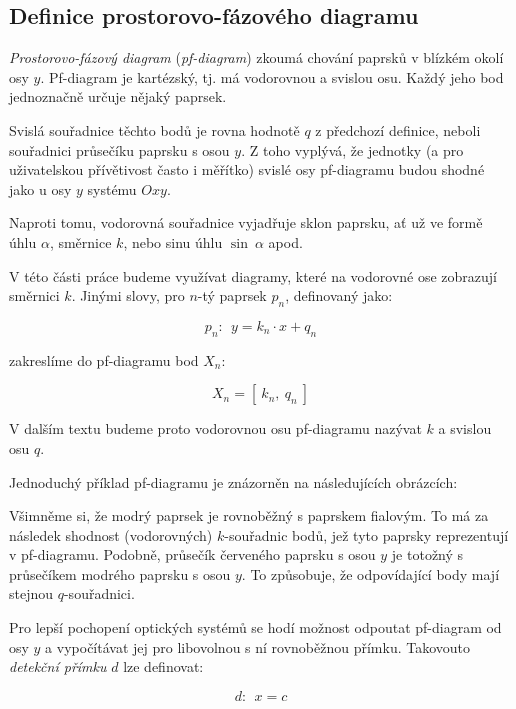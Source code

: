 \subsection{Definice prostorovo-fázového diagramu}

\emph{Prostorovo-fázový diagram} (\emph{pf-diagram}) \parencite{mushaveck2022designing} zkoumá chování paprsků v blízkém okolí osy $y$. Pf-diagram je kartézský, tj. má vodorovnou a svislou osu. Každý jeho bod jednoznačně určuje nějaký paprsek.

Svislá souřadnice těchto bodů je rovna hodnotě $q$ z předchozí definice, neboli souřadnici průsečíku paprsku s osou $y$. Z toho vyplývá, že jednotky (a pro uživatelskou přívětivost často i měřítko) svislé osy pf-diagramu budou shodné jako u osy $y$ systému $Oxy$.

Naproti tomu, vodorovná souřadnice vyjadřuje sklon paprsku, ať už ve formě úhlu $\alpha$, směrnice $k$, nebo sinu úhlu $\sin\ \alpha$ apod.

V této části práce budeme využívat diagramy, které na vodorovné ose zobrazují směrnici $k$. Jinými slovy, pro $n$-tý paprsek $p_n$, definovaný jako:

\[ p_n:\ \ y = k_n \cdot x + q_n \]

zakreslíme do pf-diagramu bod $X_n$: 

\[ X_n = [\ k_n,\ q_n\ ] \]

V dalším textu budeme proto vodorovnou osu pf-diagramu nazývat $k$ a svislou osu $q$.

Jednoduchý příklad pf-diagramu je znázorněn na následujících obrázcích:


Všimněme si, že modrý paprsek je rovnoběžný s paprskem fialovým. To má za následek shodnost (vodorovných) $k$-souřadnic bodů, jež tyto paprsky reprezentují v pf-diagramu. Podobně, průsečík červeného paprsku s osou $y$ je totožný s průsečíkem modrého paprsku s osou $y$. To způsobuje, že odpovídající body mají stejnou $q$-sou\-řad\-ni\-ci.

Pro lepší pochopení optických systémů se hodí možnost odpoutat pf-diagram od osy $y$ a vypočítávat jej pro libovolnou s ní rovnoběžnou přímku. Takovouto \emph{detekční přímku} $d$ lze definovat:

\[ d:\ \ x = c \]

